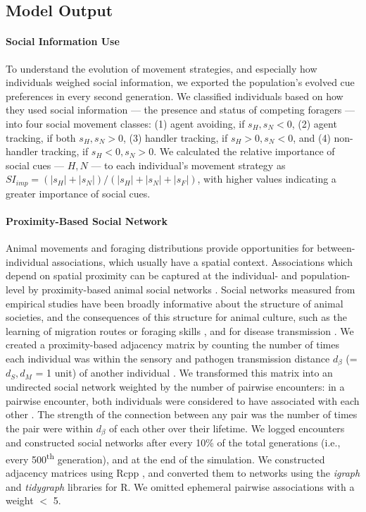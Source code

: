 \subsection*{Model Output}

\paragraph{Social Information Use}

To understand the evolution of movement strategies, and especially how individuals weighed social information, we exported the population's evolved cue preferences in every second generation.
We classified individuals based on how they used social information --- the presence and status of competing foragers --- into four social movement classes: (1) agent avoiding, if $s_H, s_N < 0$, (2) agent tracking, if both $s_H, s_N > 0$, (3) handler tracking, if $s_H > 0, s_N < 0$, and (4) non-handler tracking, if $s_H < 0, s_N > 0$.
We calculated the relative importance of social cues --- $H, N$ --- to each individual's movement strategy as $ SI_{imp} = (|s_H| + |s_N|) / (|s_H| + |s_N| + |s_F|)$, with higher values indicating a greater importance of social cues.

\paragraph{Proximity-Based Social Network}

Animal movements and foraging distributions provide opportunities for between-individual associations, which usually have a spatial context.
Associations which depend on spatial proximity can be captured at the individual- and population-level by proximity-based animal social networks \citep{whitehead2008,farine2015}.
Social networks measured from empirical studies have been broadly informative about the structure of animal societies, and the consequences of this structure for animal culture, such as the learning of migration routes or foraging skills \citep{aplin2012,aplin2013,cantor2021}, and for disease transmission \citep{stroeymeyt2018,albery2021,cantor2021}.
We created a proximity-based adjacency matrix by counting the number of times each individual was within the sensory and pathogen transmission distance $d_\beta$ (= $d_S, d_M$ = 1 unit) of another individual \citep{whitehead2008,wilber2022}.
We transformed this matrix into an undirected social network weighted by the number of pairwise encounters: in a pairwise encounter, both individuals were considered to have associated with each other \citep{white2017}.
The strength of the connection between any pair was the number of times the pair were within $d_\beta$ of each other over their lifetime.
We logged encounters and constructed social networks after every 10\% of the total generations (i.e., every 500\textsuperscript{th} generation), and at the end of the simulation.
We constructed adjacency matrices using Rcpp \citep[][]{eddelbuettel2013}, and converted them to networks using the \textit{igraph} \citep{csardi2006} and \textit{tidygraph} \citep{pedersen2020} libraries for R.
We omitted ephemeral pairwise associations with a weight $<$ 5.

